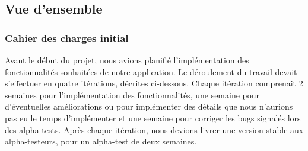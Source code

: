 \documentclass[a4paper,11pt,french]{article}
\begin{document}
\subsection{Vue d'ensemble}

\subsubsection{Cahier des charges initial}
Avant le début du projet, nous avions planifié l'implémentation des fonctionnalités souhaitées de notre application. Le déroulement du travail devait s'effectuer en quatre itérations, décrites ci-dessous. Chaque itération comprenait 2 semaines pour l'implémentation des fonctionnalités, une semaine pour d'éventuelles améliorations ou pour
implémenter des détails que nous n'aurions pas eu le temps d'implémenter et une semaine pour corriger les bugs signalés lors des alpha-tests. Après chaque itération, nous devions livrer une version stable aux alpha-testeurs, pour un alpha-test de deux semaines.
\end{document}
